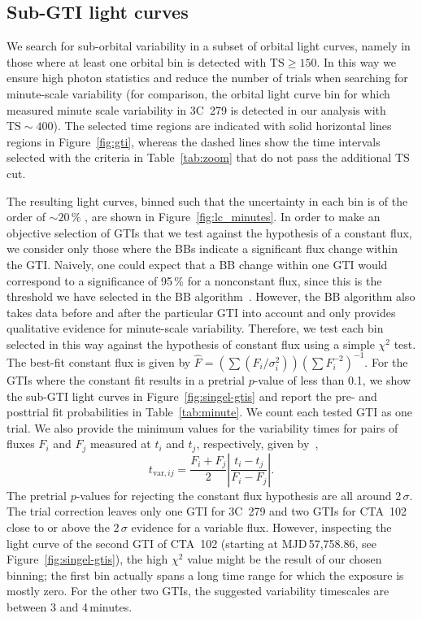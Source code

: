 \documentclass[twocolumn]{aastex62}
\begin{document}
\subsection{Sub-GTI light curves}
\label{sec:sub-gti}
We search for sub-orbital variability in a subset of orbital light curves, namely in those where at least one orbital bin is detected with $\mathrm{TS} \geqslant 150$. 
In this way we ensure high photon statistics and reduce the number of trials when searching for minute-scale variability (for comparison, the orbital light curve bin for which \citet{TheFermi-LAT:2016dss} measured minute scale variability in 3C~279 is detected in our analysis with $\mathrm{TS} \sim 400$). 
The selected time regions are indicated with solid horizontal lines regions in Figure~\ref{fig:gti}, whereas the dashed lines show the time intervals selected with the criteria in Table~\ref{tab:zoom} that do not pass the additional $\mathrm{TS}$ cut.

The resulting light curves, binned such that the uncertainty in each bin is of the order of $\sim20\,\%$ \citep[using the adaptive binning introduced by][]{lott2012}, are shown in Figure~\ref{fig:lc_minutes}. 
In order to make an objective selection of GTIs that we test against the hypothesis of a constant flux, we consider only those where the BBs indicate a significant flux change within the GTI.
Naively, one could expect that a BB change within one GTI would correspond to a significance of 95\,\% for a nonconstant flux, since this is the threshold we have selected in the BB algorithm~\citep{2013ApJ...764..167S}. However, the BB algorithm also takes data before and after the particular GTI into account and only provides qualitative evidence for minute-scale variability. 
Therefore, we test each bin selected in this way against the hypothesis of constant flux using a simple $\chi^2$ test. 
The best-fit constant flux is given by $\hat{F} = (\sum (F_i / \sigma_i^2))(\sum F_i^{-2})^{-1}$. 
For the GTIs where the constant fit results in a pretrial $p$-value of less than 0.1, we show the sub-GTI light curves in Figure~\ref{fig:singel-gtis} and report the pre- and posttrial fit probabilities in Table~\ref{tab:minute}.
We count each tested GTI as one trial. 
We also provide the minimum values for the variability times for pairs of fluxes $F_i$ and $F_j$ measured at $t_i$ and $t_j$, respectively, given by~\citet{1999ApJ...527..719Z},
\begin{equation}
t_{\mathrm{var},ij} = \frac{F_i + F_j}{2}\left|\frac{t_i - t_j}{F_i - F_j}\right|.
\end{equation}
The pretrial $p$-values for rejecting the constant flux hypothesis are all around $2\,\sigma$. 
The trial correction leaves only one GTI for 3C~279 and two GTIs for CTA~102 close to or above the $2\,\sigma$ evidence for a variable flux. 
However, inspecting the light curve of the second GTI of CTA~102 (starting at MJD\,57,758.86, see Figure~\ref{fig:singel-gtis}), the high $\chi^2$ value might be the result of our chosen binning; the first bin actually spans a long time range for which the exposure is mostly zero.  
For the other two GTIs, the suggested variability timescales are between 3 and 4\,minutes.
\end{document}
